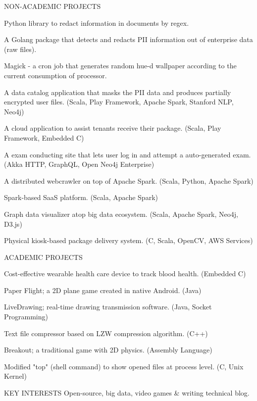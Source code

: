 \documentclass{resume}
\begin{document}
\begin{rSection}{NON-ACADEMIC PROJECTS}
  \begin{rSubsection}{}{} {} {}
    \item Python library to redact information in documents by regex.
    \item A Golang package that detects and redacts PII information out of enterprise data (raw files).
    \item Magick - a cron job that generates random hue-d wallpaper according to the current consumption of processor.
    \item A data catalog application that masks the PII data and produces partially encrypted user files. (Scala, Play Framework, Apache Spark, Stanford NLP, Neo4j)
    \item A cloud application to assist tenants receive their package. (Scala, Play Framework, Embedded C)
    \item A exam conducting site that lets user log in and attempt a auto-generated exam. (Akka HTTP, GraphQL, Open Neo4j Enterprise)
    \item A distributed webcrawler on top of Apache Spark. (Scala, Python, Apache Spark)
    \item Spark-based SaaS platform. (Scala, Apache Spark)
    \item Graph data visualizer atop big data ecosystem. (Scala, Apache Spark, Neo4j, D3.js)
    \item Physical kiosk-based package delivery system. (C, Scala, OpenCV, AWS Services)
  \end{rSubsection}

\end{rSection}

\begin{rSection}{ACADEMIC PROJECTS}
  \begin{rSubsection}{}{} {} {}
    \item Cost-effective wearable health care device to track blood health. (Embedded C)
    \item Paper Flight; a 2D plane game created in native Android. (Java)
    \item LiveDrawing; real-time drawing transmission software. (Java, Socket Programming)
    \item Text file compressor based on LZW compression algorithm. (C++)
    \item Breakout; a traditional game with 2D physics. (Assembly Language)
    \item Modified "top" (shell command) to show opened files at process level. (C, Unix Kernel)
  \end{rSubsection}
\end{rSection}

\begin{rSection}{KEY INTERESTS}
  Open-source, big data, video games \& writing technical blog.
\end{rSection}
\end{document}
